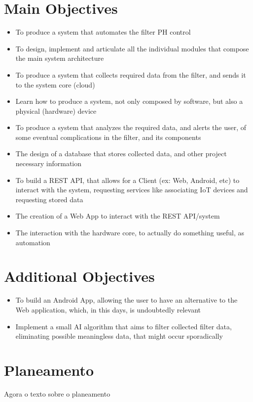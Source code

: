 \documentclass[a4paper,twoside,11pt]{article}
\begin{document}
\section*{Main Objectives}
\begin{itemize}
  \item To produce a system that automates the filter PH control
  \item To design, implement and articulate all the individual modules that compose the main system architecture
  \item To produce a system that collects required data from the filter, and sends it to the system core (cloud)
  \item Learn how to produce a system, not only composed by software, but also a physical (hardware) device
  \item To produce a system that analyzes the required data, and alerts the user, of some eventual complications in the filter, and its components
  \item The design of a database that stores collected data, and other project necessary information
  \item To build a REST API, that allows for a Client (ex: Web, Android, etc) to interact with the system, requesting services like associating IoT devices and requesting stored data
  \item The creation of a Web App to interact with the REST API/system
  \item The interaction with the hardware core, to actually do something useful, as automation
\end{itemize}

\section*{Additional Objectives}
\begin{itemize}
  \item To build an Android App, allowing the user to have an alternative to the Web application, which, in this days, is undoubtedly relevant
  \item Implement a small AI algorithm that aims to filter collected filter data, eliminating possible meaningless data, that might occur sporadically
\end{itemize}

\section*{Planeamento}
Agora o texto sobre o planeamento



\end{document}
